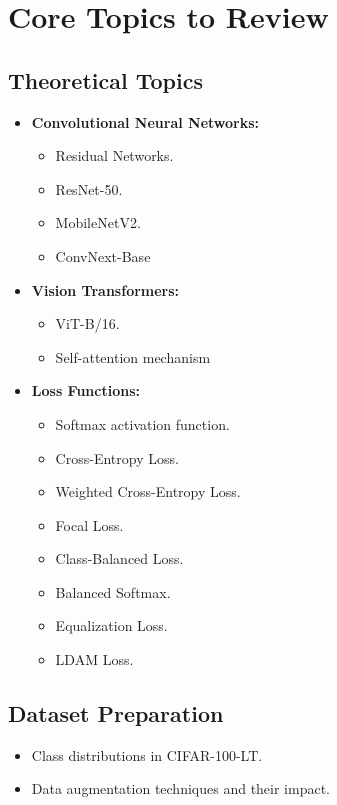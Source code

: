 \documentclass[a4paper,12pt]{article}
\begin{document}
\section{Core Topics to Review}
\subsection{Theoretical Topics}
\begin{itemize}
    \item \textbf{Convolutional Neural Networks:}
        \begin{itemize}
            \item Residual Networks.
            \item ResNet-50.
            \item MobileNetV2.
            \item ConvNext-Base
        \end{itemize}
    \item \textbf{Vision Transformers:}
        \begin{itemize}
            \item ViT-B/16.
            \item Self-attention mechanism
        \end{itemize}
    \item \textbf{Loss Functions:}
        \begin{itemize}
            \item Softmax activation function.
            \item Cross-Entropy Loss.
            \item Weighted Cross-Entropy Loss.
            \item Focal Loss.
            \item Class-Balanced Loss.
            \item Balanced Softmax.
            \item Equalization Loss.
            \item LDAM Loss.
        \end{itemize}
\end{itemize}

\subsection{Dataset Preparation}
\begin{itemize}
    \item Class distributions in CIFAR-100-LT.
    \item Data augmentation techniques and their impact.
\end{itemize}
\end{document}
